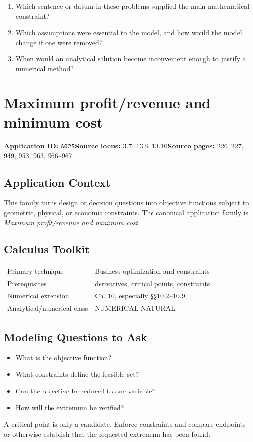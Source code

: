 \documentclass[11pt]{book}
\newcommand{\pid}[1]{\texttt{#1}}
\begin{document}
\begin{reflectionbox}\begin{enumerate}
\item Which sentence or datum in these problems supplied the main mathematical constraint?
\item Which assumptions were essential to the model, and how would the model change if one were removed?
\item When would an analytical solution become inconvenient enough to justify a numerical method?
\end{enumerate}\end{reflectionbox}
\chapter{Maximum profit/revenue and minimum cost}\label{app:A025}
\textbf{Application ID:} \pid{A025}\quad \textbf{Source locus:} 3.7; 13.9–13.10\quad \textbf{Source pages:} 226–227, 949, 953, 963, 966–967
\section*{Application Context}
This family turns design or decision questions into objective functions subject to geometric, physical, or economic constraints. The canonical application family is \emph{Maximum profit/revenue and minimum cost}.
\section*{Calculus Toolkit}
\begin{tabularx}{\textwidth}{@{}lX@{}}\toprule
Primary technique & Business optimization and constraints \\
Prerequisites & derivatives, critical points, constraints \\
Numerical extension & Ch. 10, especially §§10.2–10.9 \\
Analytical/numerical class & NUMERICAL-NATURAL \\
\bottomrule\end{tabularx}
\section*{Modeling Questions to Ask}\begin{itemize}
\item What is the objective function?
\item What constraints define the feasible set?
\item Can the objective be reduced to one variable?
\item How will the extremum be verified?
\end{itemize}
\begin{errorbox}A critical point is only a candidate. Enforce constraints and compare endpoints or otherwise establish that the requested extremum has been found.\end{errorbox}
\end{document}
